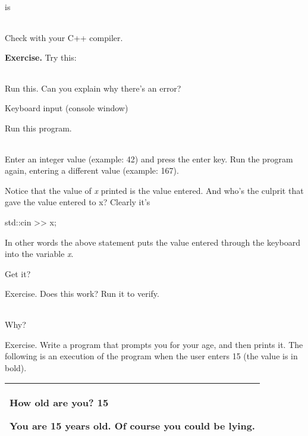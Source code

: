 \documentclass[
]{article}
\begin{document}
is

\begin{longtable}[]{@{}@{}}
\toprule
\endhead
\bottomrule
\end{longtable}

Check with your C++ compiler.

\textbf{Exercise.} Try this:

\begin{longtable}[]{@{}@{}}
\toprule
\endhead
\bottomrule
\end{longtable}

Run this. Can you explain why there's an error?

Keyboard input (console window)

Run this program.

\begin{longtable}[]{@{}@{}}
\toprule
\endhead
\bottomrule
\end{longtable}

Enter an integer value (example: 42) and press the enter key. Run the
program again, entering a different value (example: 167).

Notice that the value of \emph{x} printed is the value entered. And
who's the culprit that gave the value entered to x? Clearly it's

std::cin \textgreater\textgreater{} x;

In other words the above statement puts the value entered through the
keyboard into the variable \emph{x}.

Get it?

Exercise. Does this work? Run it to verify.

\begin{longtable}[]{@{}@{}}
\toprule
\endhead
\bottomrule
\end{longtable}

Why?

Exercise. Write a program that prompts you for your age, and then prints
it. The following is an execution of the program when the user enters 15
(the value is in bold).

\begin{longtable}[]{@{}l@{}}
\toprule
\endhead
\begin{minipage}[t]{0.97\columnwidth}\raggedright
How old are you? \textbf{15}

You are 15 years old. Of course you could be lying.\strut
\end{minipage}\tabularnewline
\bottomrule
\end{longtable}
\end{document}
